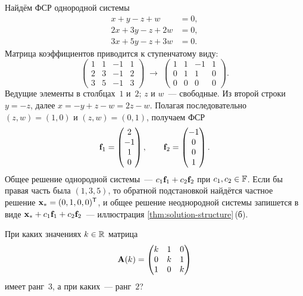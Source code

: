 \begin{example}
\label{ex:fsr}
Найдём ФСР однородной системы
\[
  \begin{aligned}
    x + y - z + w &= 0, \\
    2x + 3y - z + 2w &= 0, \\
    3x + 5y - z + 3w &= 0.
  \end{aligned}
\]
Матрица коэффициентов приводится к ступенчатому виду:
\[
  \begin{pmatrix}
    1 & 1 & -1 & 1 \\
    2 & 3 & -1 & 2 \\
    3 & 5 & -1 & 3
  \end{pmatrix}
  \;\longrightarrow\;
  \begin{pmatrix}
    1 & 1 & -1 & 1 \\
    0 & 1 & 1 & 0 \\
    0 & 0 & 0 & 0
  \end{pmatrix}.
\]
Ведущие элементы в столбцах~$1$ и~$2$; $z$ и $w$~--- свободные. Из
второй строки $y = -z$, далее $x = -y + z - w = 2z - w$. Полагая
последовательно $(z, w) = (1, 0)$ и $(z, w) = (0, 1)$, получаем ФСР
\[
  \mathbf{f}_1 = \begin{pmatrix} 2 \\ -1 \\ 1 \\ 0 \end{pmatrix}, \qquad
  \mathbf{f}_2 = \begin{pmatrix} -1 \\ 0 \\ 0 \\ 1 \end{pmatrix}.
\]
Общее решение однородной системы~--- $c_1 \mathbf{f}_1 + c_2 \mathbf{f}_2$
при $c_1, c_2 \in \mathbb{F}$. Если бы правая часть была $(1, 3, 5)$, то
обратной подстановкой найдётся частное решение
$\mathbf{x}_* = (0, 1, 0, 0)^{\mathsf{T}}$, и общее решение неоднородной системы
запишется в виде $\mathbf{x}_* + c_1 \mathbf{f}_1 + c_2 \mathbf{f}_2$~---
иллюстрация \cref{thm:solution-structure}\,(б).
\end{example}

\begin{problem}
\label{prob:rank-parameter}
При каких значениях $k \in \mathbb{R}$ матрица
\[
  \mathbf{A}(k) = \begin{pmatrix}
    k & 1 & 0 \\
    0 & k & 1 \\
    1 & 0 & k
  \end{pmatrix}
\]
имеет ранг~$3$, а при каких~--- ранг~$2$?
\end{problem}

